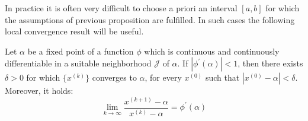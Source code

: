 \documentclass[12pt, a4paper]{report}
\newtheorem[style=M,bodystyle=\normalfont]{theorem}{Theorem}
\newtheorem[style=M,bodystyle=\normalfont]{proposition}{Proposition}
\newtheorem[style=M,bodystyle=\normalfont]{corollary}{Corollary}
\newtheorem[style=M,bodystyle=\normalfont]{lemma}{Lemma}
\newtheorem[style=M,bodystyle=\normalfont]{definition}{Definition}
\begin{document}
    In practice it is often very difficult to choose a priori an interval $[a,b]$ for which the assumptions of previous proposition are fulfilled. In such cases the following local
    convergence result will be useful. 
    \begin{theorem}[Ostrowski]
        Let $\alpha$ be a fixed point of a function $\phi$ which is continuous and continuously differentiable in a suitable neighborhood $\mathcal{J}$ of $\alpha$. If 
        $\left\lvert \phi^{'}(\alpha) \right\rvert < 1$, then there exists $\delta > 0$ for which $\{x^{(k)}\}$ converges to $\alpha$, for every $x^{(0)}$ such that 
        $\left\lvert x^{(0)}-\alpha \right\rvert < \delta$. Moreover, it holds: 
        \[\lim_{k \rightarrow \infty}\dfrac{x^{(k+1)}-\alpha}{x^{(k)}-\alpha}=\phi^{'}(\alpha)\]
    \end{theorem}
\end{document}
